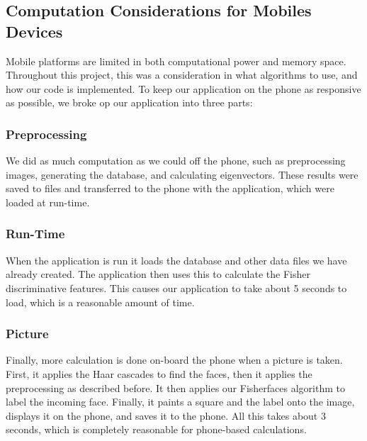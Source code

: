 



\subsection{Computation Considerations for Mobiles Devices}


Mobile platforms are limited in both computational power
and memory space.  Throughout this project, this was a consideration in what algorithms to use, and how our code is implemented.  To keep our application on the phone as responsive as possible, we broke op our application into three parts:

\subsubsection{Preprocessing}

We did as much computation as we could off the phone, such as
preprocessing images, generating the database, and calculating
eigenvectors.  These results were saved to files and transferred to
the phone with the application, which were loaded at run-time.

\subsubsection{Run-Time}

When the application is run it loads the database and other data files
we have already created.  The application then uses this to calculate
the Fisher discriminative features.  This causes our application to
take about 5 seconds to load, which is a reasonable amount of time.

\subsubsection{Picture}

Finally, more calculation is done on-board the phone when a picture is
taken.  First, it applies the Haar cascades to find the faces, then it
applies the preprocessing as described before. It then applies our
Fisherfaces algorithm to label the incoming face.  Finally, it paints
a square and the label onto the image, displays it on the phone, and
saves it to the phone.  All this takes about 3 seconds, which is
completely reasonable for phone-based calculations.

